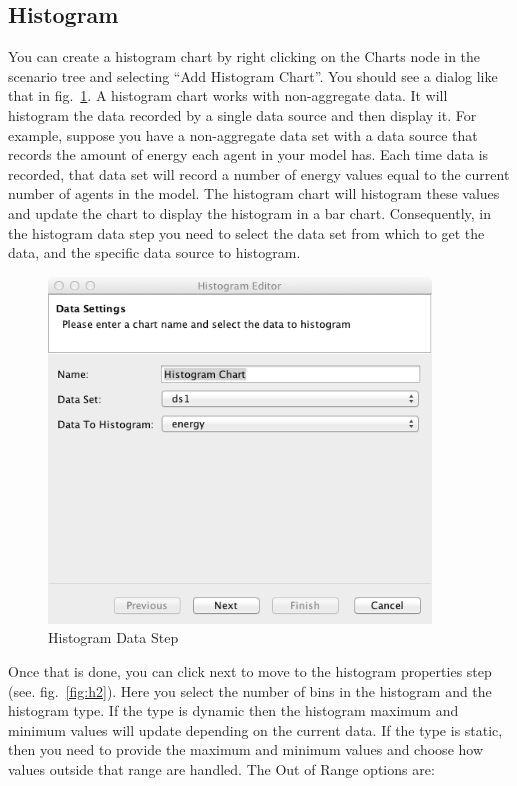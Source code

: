 \documentclass[11pt]{amsart}
\begin{document}
\subsection{Histogram}
You can create a histogram chart by right clicking on the Charts node in the scenario tree and selecting ``Add Histogram Chart''. You should see a dialog like that in fig.~\ref{fig:h1}. A histogram chart works with non-aggregate data. It will histogram the data recorded by a single data source and then display it. For example, suppose you have a non-aggregate data set with a data source that records the amount of energy each agent in your model has. Each time data is recorded, that data set will record a number of energy values equal to the current number of agents in the model. The histogram chart will histogram these values and update the chart to display the histogram in a bar chart. Consequently, in the histogram data step you need to select the data set from which to get the data, and the specific data source to histogram.

\begin{figure}[h]
\begin{center}
\vspace{.2in}
\centerline {
\includegraphics[width=4in]{images/h1.png}
}
\caption{Histogram Data Step}
\label{fig:h1}
\end{center}
\end{figure}

Once that is done, you can click next to move to the histogram properties step (see. fig.~\ref{fig:h2}). Here you select the number of bins in the histogram and the histogram type. If the type is dynamic then the histogram maximum and minimum values will update depending on the current data. If the type is static, then you need to provide the maximum and minimum values and choose how values outside that range are handled. The Out of Range options are:
\end{document}
